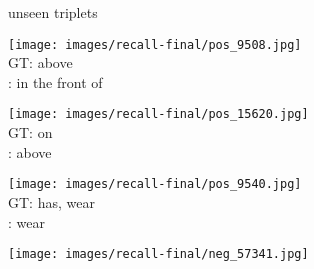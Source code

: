 \documentclass[10pt,twocolumn,letterpaper]{article}
\begin{document}
\begin{figure*}[t]
	\begin{minipage}[b]{0.005\textwidth}
    	\centering
    	\begin{turn}{90}
    	unseen triplets
    	\end{turn}
    	\vspace{1.5ex}
   	\end{minipage}
    \hspace{0.01\textwidth}
    \begin{minipage}[b]{0.18\textwidth}
    	\centering
       	\texttt{[image: images/recall-final/pos\_9508.jpg]}\\
       	\vspace{0.2ex}
       	\small{
       	GT: above\\
       	\cite{Lu16}: in the front of
       	}
       	\vspace{0.3ex}
    \end{minipage}
    \hspace{0.005\textwidth}
    \begin{minipage}[b]{0.18\textwidth}
    	\centering
       	\texttt{[image: images/recall-final/pos\_15620.jpg]}\\
       	\vspace{0.2ex}
       	\small{
       	GT: on\\
       	\cite{Lu16}: above
       	}
       	\vspace{0.3ex}
    \end{minipage}  
    \hspace{0.005\textwidth}
    \begin{minipage}[b]{0.18\textwidth}
    	\centering
       	\texttt{[image: images/recall-final/pos\_9540.jpg]}\\
       	\vspace{0.2ex}
       	\small{
       	GT: has, wear\\
       	\cite{Lu16}: wear
       	}
       	\vspace{0.3ex}
    \end{minipage} 
    \hspace{0.005\textwidth}
    \begin{minipage}[b]{0.18\textwidth}
       	\centering
    	\texttt{[image: images/recall-final/neg\_57341.jpg]}\\

\end{minipage}
\end{figure*}
\end{document}
